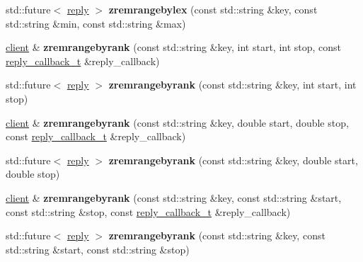 \begin{DoxyCompactItemize}
std\+::future$<$ \mbox{\hyperlink{classcpp__redis_1_1reply}{reply}} $>$ {\bfseries zremrangebylex} (const std\+::string \&key, const std\+::string \&min, const std\+::string \&max)
\item 
\mbox{\label{classcpp__redis_1_1client_af40c1e6895312c13636db9dd610ce753}} 
\mbox{\hyperlink{classcpp__redis_1_1client}{client}} \& {\bfseries zremrangebyrank} (const std\+::string \&key, int start, int stop, const \mbox{\hyperlink{classcpp__redis_1_1client_af7a65eb21aa25230bfbb0b0203c4fc04}{reply\+\_\+callback\+\_\+t}} \&reply\+\_\+callback)
\item 
\mbox{\label{classcpp__redis_1_1client_acc4f3b77c38c948658505ce04bbbde6d}} 
std\+::future$<$ \mbox{\hyperlink{classcpp__redis_1_1reply}{reply}} $>$ {\bfseries zremrangebyrank} (const std\+::string \&key, int start, int stop)
\item 
\mbox{\label{classcpp__redis_1_1client_a727a7eeae900fc82525544618deaa70b}} 
\mbox{\hyperlink{classcpp__redis_1_1client}{client}} \& {\bfseries zremrangebyrank} (const std\+::string \&key, double start, double stop, const \mbox{\hyperlink{classcpp__redis_1_1client_af7a65eb21aa25230bfbb0b0203c4fc04}{reply\+\_\+callback\+\_\+t}} \&reply\+\_\+callback)
\item 
\mbox{\label{classcpp__redis_1_1client_a7ad8503cfe002efb2caa36a09791125f}} 
std\+::future$<$ \mbox{\hyperlink{classcpp__redis_1_1reply}{reply}} $>$ {\bfseries zremrangebyrank} (const std\+::string \&key, double start, double stop)
\item 
\mbox{\label{classcpp__redis_1_1client_aafca4e3ca703fff85b1b6a1c9476c958}} 
\mbox{\hyperlink{classcpp__redis_1_1client}{client}} \& {\bfseries zremrangebyrank} (const std\+::string \&key, const std\+::string \&start, const std\+::string \&stop, const \mbox{\hyperlink{classcpp__redis_1_1client_af7a65eb21aa25230bfbb0b0203c4fc04}{reply\+\_\+callback\+\_\+t}} \&reply\+\_\+callback)
\item 
\mbox{\label{classcpp__redis_1_1client_a2215c127cf351c43b69f62d871e7acb7}} 
std\+::future$<$ \mbox{\hyperlink{classcpp__redis_1_1reply}{reply}} $>$ {\bfseries zremrangebyrank} (const std\+::string \&key, const std\+::string \&start, const std\+::string \&stop)

\end{DoxyCompactItemize}
